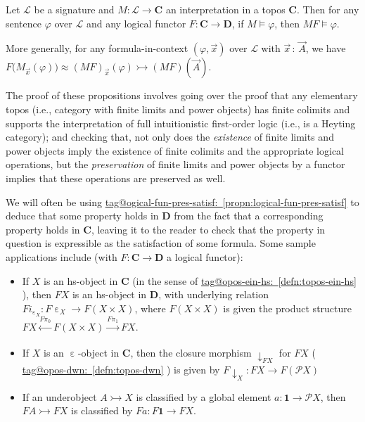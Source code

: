 \documentclass{amsart}
\makeatletter
\newcommand\bC{\mathbf{C}}
\newcommand\bD{\mathbf{D}}
\newcommand\cL{\mathcal{L}}
\newcommand\dwn{\mathpunct{\downarrow}}
\newcommand\ein{\mathrel{\varepsilon}}
\newcommand\pbig[1]{\big({#1}\big)}
\renewcommand\phi{\varphi}
\newcommand\pow{\mathcal{P}}
\newcommand\tm{\mathbf{1}}
\newcommand\tolon{{\,:\,}}
\newcommand\tox[2][]{\xrightarrow[#1]{#2}}
\newcommand\tto{\rightarrowtail}
\newcommand\unein{{\ein}}
\newcommand\vA{\vek{A}}
\newcommand\vek[1]{{\vec{#1}}}
\newcommand\vx{\vek{x}}
\newcommand\xot[2][]{\xleftarrow[#1]{#2}}
\newcommand\tagword[1]{\csname tag@#1\endcsname}
\def\label@tag#1:#2\@nil{#1}
\newcommand\labeltag[1]{\label@tag#1:\@nil}
\newcommand\jref[1]{%
  \texorpdfstring%
    {\hyperref[#1]{\tagword{\labeltag{#1}}~\ref*{#1}}}%
    {\tagword{\labeltag{#1}}~\ref*{#1}}%
}
\theoremstyle{definition}
\theoremstyle{remark}
\theoremstyle{plainwithref}
\makeatother
\begin{document}
\begin{propn}\label{propn:logical-fun-pres-satisf}
  Let \( \cL \) be a signature and \( M \colon \cL \to \bC \) an interpretation in a topos \( \bC \).
  Then for any sentence \( \phi \) over \( \cL \) and any logical functor \( F \colon \bC \to \bD \), if \( M \vDash \phi \), then \( M F \vDash \phi \).

  More generally, for any formula-in-context \( (\phi, \vx) \) over \( \cL \) with \( \vx \tolon \vA \),
  we have \( F\pbig{M_\vx(\phi)} \approx (M F)_\vx(\phi) \tto (M F)(\vA) \).
\end{propn}
\noindent
The proof of these propositions involves going over the proof that any elementary topos (i.e., category with finite limits and power objects) has finite colimits and supports the interpretation of full intuitionistic first-order logic (i.e., is a Heyting category); and checking that, not only does the \emph{existence} of finite limits and power objects imply the existence of finite colimits and the appropriate logical operations, but the \emph{preservation} of finite limits and power objects by a functor implies that these operations are preserved as well.

We will often be using \jref{propn:logical-fun-pres-satisf} to deduce that some property holds in \( \bD \) from the fact that a corresponding property holds in \( \bC \), leaving it to the reader to check that the property in question is expressible as the satisfaction of some formula.
Some sample applications include (with \( F \colon \bC \to \bD \) a logical functor):
\begin{itemize}
\item If \( X \) is an hs-object in \( \bC \) (in the sense of \jref{defn:topos-ein-hs}), then \( F X \) is an hs-object in \( \bD \), with underlying relation \( F i_{\unein_X} \colon F \unein_X \to F(X \times X) \), where \( F(X \times X) \) is given the product structure \( F X \xot{F \pi_0} F(X \times X) \tox{F \pi_1} F X \).
\item If \( X \) is an \( \unein \)-object in \( \bC \), then the closure morphism \( \dwn_{F X} \) for \( F X \) (\jref{defn:topos-dwn}) is given by \( F \dwn_X \colon F X \to F (\pow X) \)
\item If an underobject \( A \tto X \) is classified by a global element \( a \colon \tm \to \pow X \), then \( F A \tto F X \) is classified by \( F a \colon F \tm \to F X \).
\end{itemize}
\end{document}
